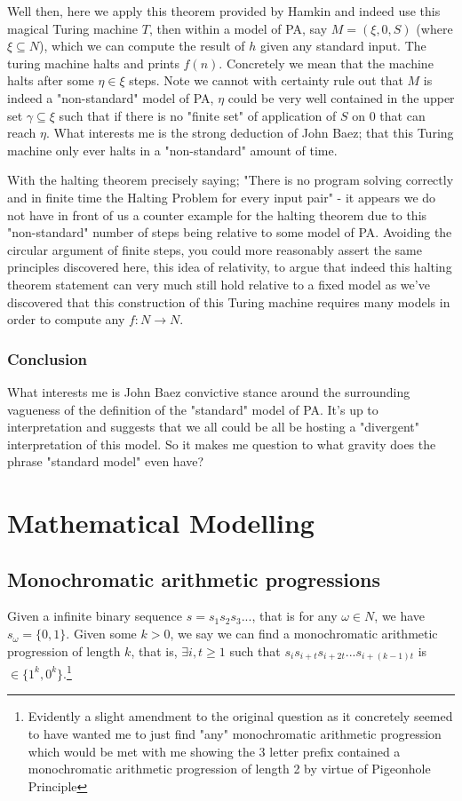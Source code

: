 \documentclass{article}
\begin{document}
Well then, here we apply this theorem provided by Hamkin and indeed use this magical Turing machine $T$, then within a model of PA, say $M = (\xi,0,S)$ (where $\xi \subseteq N$), which we can compute the result of $h$ given any standard input. The turing machine halts and prints $f(n)$. Concretely we mean that the machine halts after some $\eta \in \xi$ steps. Note we cannot with certainty rule out that $M$ is indeed a "non-standard" model of PA, $\eta$ could be very well contained in the upper set $\gamma \subseteq \xi$ such that if there is no "finite set" of application of $S$ on $0$ that can reach $\eta$. What interests me is the strong deduction of John Baez; that this Turing machine only ever halts in a "non-standard" amount of time.

With the halting theorem precisely saying; "There is no program solving correctly and in finite time the Halting Problem for every input pair" - it appears we do not have in front of us a counter example for the halting theorem due to this "non-standard" number of steps being relative to some model of PA. Avoiding the circular argument of finite steps, you could more reasonably assert the same principles discovered here, this idea of relativity, to argue that indeed this halting theorem statement can very much still hold relative to a fixed model as we've discovered that this construction of this Turing machine requires many models in order to compute any $f: N \rightarrow N$.

\subsubsection{Conclusion}
What interests me is John Baez convictive stance around the surrounding vagueness of the definition of the "standard" model of PA. It's up to interpretation and suggests that we all could be all be hosting a "divergent" interpretation of this model. So it makes me question to what gravity does the phrase "standard model" even have?

\pagebreak

\section{Mathematical Modelling}
\subsection{Monochromatic arithmetic progressions}
Given a infinite binary sequence $s = s_{1}s_{2}s_{3}...$, that is for any $\omega \in N$, we have $s_{\omega} = \{0, 1\}$. Given some $k > 0$, we say we can find a monochromatic arithmetic progression of length $k$, that is, $\exists i,t \geq 1$ such that $s_{i}s_{i+t}s_{i+2t}...s_{i+(k-1)t}$ is $\in \{1^k,0^k\}$.\footnote{Evidently a slight amendment to the original question as it concretely seemed to have wanted me to just find  "any" monochromatic arithmetic progression which would be met with me showing the 3 letter prefix contained a monochromatic arithmetic progression of length 2 by virtue of Pigeonhole Principle}
\end{document}
